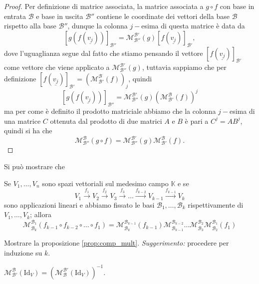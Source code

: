 \begin{proof}
  Per definizione di matrice associata, la matrice associata a $g \circ f$ con base in entrata $\mathcal{B}$ e base in uscita $\mathcal{B''}$ contiene le coordinate dei vettori della base $\mathcal{B}$ rispetto alla base $\mathcal{B''}$, dunque la colonna $j-$esima di questa matrice è data da
  $$
  [g(f(\underline{v_j}))]_\mathcal{B''} = \mathcal{M}_\mathcal{B''}^\mathcal{B'}(g) [f(\underline{v_j})]_\mathcal{B'},
  $$
  dove l'uguaglianza segue dal fatto che stiamo pensando il vettore $[f(\underline{v_j})]_\mathcal{B'}$ come vettore che viene applicato a $\mathcal{M}^{\mathcal{B'}}_\mathcal{B''}(g)$, tuttavia sappiamo che per definizione $[f(\underline{v_j})]_\mathcal{B'} = (\mathcal{M}^\mathcal{B}_\mathcal{B'}(f))_j$, quindi
  $$
    [g(f(\underline{v_j}))]_\mathcal{B''} = \mathcal{M}_\mathcal{B''}^\mathcal{B'}(g) (\mathcal{M}^\mathcal{B}_\mathcal{B'}(f))^j
  $$
  ma per come è definito il prodotto matriciale abbiamo che la colonna $j-$esima di una matrice $C$ ottenuta dal prodotto di due matrici $A$ e $B$ è pari a $C^j = AB^j$, quindi si ha che
  $$
    \mathcal{M}^\mathcal{B}_\mathcal{B''}(g \circ f) = \mathcal{M}^\mathcal{B'}_\mathcal{B''}(g) \mathcal{M}^\mathcal{B}_\mathcal{B'}(f).
  $$
\end{proof}
Si può mostrare che
\begin{prop} \label{prop:comp_mult}
  Se $V_1, \ldots, V_n$ sono spazi vettoriali sul medesimo campo $\mathbb{K}$ e se
  $$
    V_1 \stackrel{f_1}{\to} V_2 \stackrel{f_2}{\to} V_3 \stackrel{f_3}{\to} \ldots \stackrel{f_{k-2}}{\to} V_{k-1} \stackrel{f_{k-1}}{\to} V_k
  $$
  sono applicazioni lineari e abbiamo fissato le basi $\mathcal{B}_1, \ldots, \mathcal{B}_k$ rispettivamente di $V_1, \ldots, V_k$; allora
  $$
    \mathcal{M}^{\mathcal{B}_1}_{\mathcal{B}_k} (f_{k-1} \circ f_{k-2} \circ \ldots \circ f_1) = \mathcal{M}^{\mathcal{B}_{k-1}}_{\mathcal{B}_k}(f_{k-1})\mathcal{M}^{\mathcal{B}_{k-2}}_{\mathcal{B}_{k-1}} \ldots \mathcal{M}^{\mathcal{B}_2}_{\mathcal{B}_3} \mathcal{M}^{\mathcal{B}_1}_{\mathcal{B}_2}(f_1)
  $$
\end{prop}
\begin{exercise}
  Mostrare la proposizione \ref{prop:comp_mult}. \emph{Suggerimento:} procedere per induzione su $k$.
\end{exercise}
\begin{prop}
  $\mathcal{M}^\mathcal{B}_\mathcal{B'}(\text{Id}_V) = (\mathcal{M}^\mathcal{B'}_\mathcal{B}(\text{Id}_V))^{-1}$.
\end{prop}
